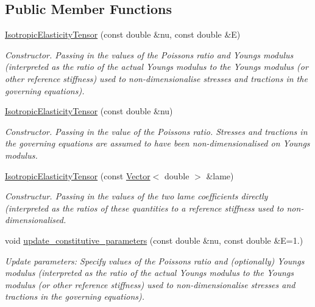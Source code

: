 \subsection*{Public Member Functions}
\begin{DoxyCompactItemize}
\item 
\hyperlink{classoomph_1_1IsotropicElasticityTensor_a022f9a6cb2339393a2cbc8eee81717e5}{Isotropic\+Elasticity\+Tensor} (const double \&nu, const double \&E)
\begin{DoxyCompactList}\small\item\em Constructor. Passing in the values of the Poisson\textquotesingle{}s ratio and Young\textquotesingle{}s modulus (interpreted as the ratio of the actual Young\textquotesingle{}s modulus to the Young\textquotesingle{}s modulus (or other reference stiffness) used to non-\/dimensionalise stresses and tractions in the governing equations). \end{DoxyCompactList}\item 
\hyperlink{classoomph_1_1IsotropicElasticityTensor_a61cc521701ca584ca74477aab86865f6}{Isotropic\+Elasticity\+Tensor} (const double \&nu)
\begin{DoxyCompactList}\small\item\em Constructor. Passing in the value of the Poisson\textquotesingle{}s ratio. Stresses and tractions in the governing equations are assumed to have been non-\/dimensionalised on Young\textquotesingle{}s modulus. \end{DoxyCompactList}\item 
\hyperlink{classoomph_1_1IsotropicElasticityTensor_a0f4785c975f317f98864f28bb977a516}{Isotropic\+Elasticity\+Tensor} (const \hyperlink{classoomph_1_1Vector}{Vector}$<$ double $>$ \&lame)
\begin{DoxyCompactList}\small\item\em Constructur. Passing in the values of the two lame coefficients directly (interpreted as the ratios of these quantities to a reference stiffness used to non-\/dimensionalised. \end{DoxyCompactList}\item 
void \hyperlink{classoomph_1_1IsotropicElasticityTensor_a980736a39c91e69b4ab7d2f62b740da2}{update\+\_\+constitutive\+\_\+parameters} (const double \&nu, const double \&E=1.)
\begin{DoxyCompactList}\small\item\em Update parameters\+: Specify values of the Poisson\textquotesingle{}s ratio and (optionally) Young\textquotesingle{}s modulus (interpreted as the ratio of the actual Young\textquotesingle{}s modulus to the Young\textquotesingle{}s modulus (or other reference stiffness) used to non-\/dimensionalise stresses and tractions in the governing equations). \end{DoxyCompactList}\item 

\end{DoxyCompactItemize}
